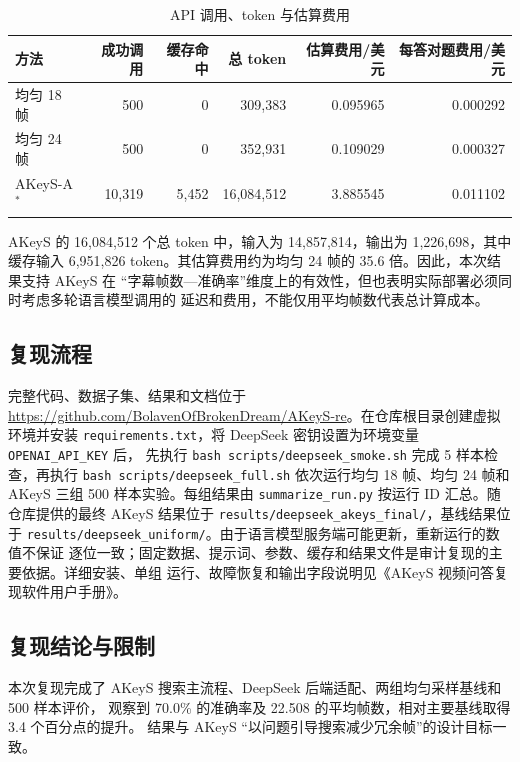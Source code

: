 \documentclass[12pt,UTF8]{ctexart}
\begin{document}
\begin{table}[htbp]
  \centering\scriptsize
  \setlength{\tabcolsep}{4pt}
  \caption{API 调用、token 与估算费用}
  \label{tab:cost}
  \begin{tabular}{lrrrrr}
    \toprule
    方法 & 成功调用 & 缓存命中 & 总 token & 估算费用/美元 & 每答对题费用/美元 \\
    \midrule
    均匀 18 帧 & 500 & 0 & 309,383 & 0.095965 & 0.000292 \\
    均匀 24 帧 & 500 & 0 & 352,931 & 0.109029 & 0.000327 \\
    AKeyS-A$^*$ & 10,319 & 5,452 & 16,084,512 & 3.885545 & 0.011102 \\
    \bottomrule
  \end{tabular}
\end{table}

AKeyS 的 16,084,512 个总 token 中，输入为 14,857,814，输出为 1,226,698，其中缓存输入
6,951,826 token。其估算费用约为均匀 24 帧的 35.6 倍。因此，本次结果支持 AKeyS 在
“字幕帧数—准确率”维度上的有效性，但也表明实际部署必须同时考虑多轮语言模型调用的
延迟和费用，不能仅用平均帧数代表总计算成本。

\subsection{复现流程}

{\sloppy
完整代码、数据子集、结果和文档位于
\url{https://github.com/BolavenOfBrokenDream/AKeyS-re}。在仓库根目录创建虚拟环境并安装
\texttt{requirements.txt}，将 DeepSeek 密钥设置为环境变量 \texttt{OPENAI\_API\_KEY} 后，
先执行 \texttt{bash scripts/deepseek\_smoke.sh} 完成 5 样本检查，再执行
\texttt{bash scripts/deepseek\_full.sh} 依次运行均匀 18 帧、均匀 24 帧和 AKeyS 三组
500 样本实验。每组结果由 \texttt{summarize\_run.py} 按运行 ID 汇总。随仓库提供的最终
AKeyS 结果位于 \texttt{results/deepseek\_akeys\_final/}，基线结果位于
\texttt{results/deepseek\_uniform/}。由于语言模型服务端可能更新，重新运行的数值不保证
逐位一致；固定数据、提示词、参数、缓存和结果文件是审计复现的主要依据。详细安装、单组
运行、故障恢复和输出字段说明见《AKeyS 视频问答复现软件用户手册》。
\par}

\subsection{复现结论与限制}

本次复现完成了 AKeyS 搜索主流程、DeepSeek 后端适配、两组均匀采样基线和 500 样本评价，
观察到 70.0\% 的准确率及 22.508 的平均帧数，相对主要基线取得 3.4 个百分点的提升。
结果与 AKeyS “以问题引导搜索减少冗余帧”的设计目标一致。
\end{document}
